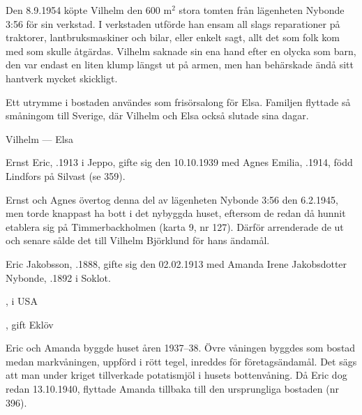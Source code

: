 Den 8.9.1954 köpte Vilhelm den 600 m$^2$ stora tomten från lägenheten Nybonde 3:56 för sin verkstad. I verkstaden utförde han ensam all slags reparationer på traktorer, lantbruksmaskiner och bilar, eller enkelt sagt, allt det som folk kom med som skulle åtgärdas. Vilhelm saknade sin ena hand efter en olycka som barn, den var endast en liten klump längst ut på armen, men han behärskade ändå sitt hantverk mycket skickligt.

Ett utrymme i bostaden användes som frisörsalong för Elsa. Familjen flyttade så småningom till Sverige, där Vilhelm och Elsa också slutade sina dagar.

Vilhelm   ---  Elsa 


Ernst Eric, .1913 i Jeppo, gifte sig den 10.10.1939 med Agnes Emilia, .1914, född Lindfors på Silvast (se 359).
\begin{jhchildren}
  \item {}
  \item {}
  \item {}
\end{jhchildren}

Ernst och Agnes övertog denna del av lägenheten Nybonde 3:56 den 6.2.1945, men torde knappast ha bott i det nybyggda huset, eftersom de redan då hunnit etablera sig på Timmerbackholmen (karta 9, nr 127). Därför arrenderade de ut och senare sålde det till Vilhelm Björklund för hans ändamål.


Eric Jakobsson, .1888, gifte sig den 02.02.1913 med Amanda Irene Jakobsdotter Nybonde, .1892 i Soklot.
\begin{jhchildren}
  \item {}, i USA
  \item {}
  \item {}, gift Eklöv
\end{jhchildren}

Eric och Amanda byggde huset åren 1937--38. Övre våningen byggdes som bostad medan markvåningen, uppförd i rött tegel, inreddes för 	företagsändamål. Det sägs att man under kriget tillverkade potatismjöl i husets  bottenvåning. Då Eric dog redan 13.10.1940, flyttade Amanda tillbaka till den ursprungliga bostaden (nr 396).

